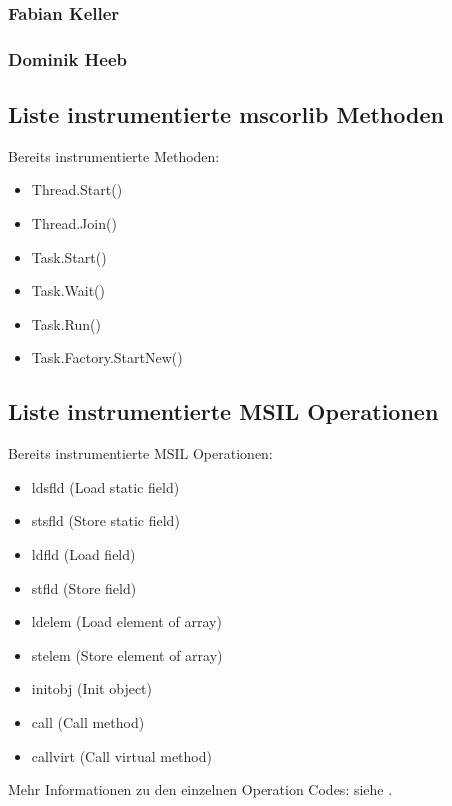 \documentclass[10pt,a4paper]{article}
\begin{document}
\subsubsection*{Fabian Keller}
\subsubsection*{Dominik Heeb}
\subsection*{Liste instrumentierte mscorlib Methoden}\label{sec:instrumentierte_methoden}
Bereits instrumentierte Methoden:
\begin{itemize}
\setlength\itemsep{0em}
\item Thread.Start()
\item Thread.Join()
\item Task.Start()
\item Task.Wait()
\item Task.Run()
\item Task.Factory.StartNew()
\end{itemize}
\subsection*{Liste instrumentierte MSIL Operationen}
Bereits instrumentierte MSIL Operationen:
\begin{itemize}
\setlength\itemsep{0em}
\item ldsfld (Load static field)
\item stsfld (Store static field)
\item ldfld (Load field)
\item stfld (Store field)
\item ldelem (Load element of array)
\item stelem (Store element of array)
\item initobj (Init object)
\item call (Call method)
\item callvirt (Call virtual method)
\end{itemize}
Mehr Informationen zu den einzelnen Operation Codes: siehe \cite{ecma}.
\end{document}
